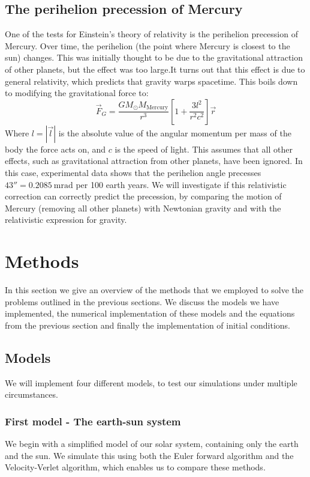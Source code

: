 \documentclass[a4paper, 10pt]{article}
\begin{document}
\subsection{The perihelion precession of Mercury}\label{GR_section}
One of the tests for Einstein's theory of relativity is the perihelion precession of Mercury.  Over time, the perihelion (the point where Mercury is closest to the sun) changes. This was initially thought to be due to the gravitational attraction of other planets, but the effect was too large.It turns out that this effect is due to general relativity, which predicts that gravity warps spacetime. This boils down to modifying the gravitational force to:
\begin{equation}\label{eq:GR_equation}
\vec{F}_G=\frac{GM_{\odot}M_{\mathrm{Mercury}}}{r^3}\left[1+\frac{3l^2}{r^2c^2}\right]\vec{r}
\end{equation}
Where $l=|\vec{l}|$ is the absolute value of the angular momentum per mass of the body the force acts on, and $c$ is the speed of light. This assumes that all other effects, such as gravitational attraction from other planets, have been ignored. In this case, experimental data shows that the perihelion angle precesses $43''=0.2085\  \mathrm{mrad}$ per 100 earth years. We will investigate if this relativistic correction can correctly predict the precession, by comparing the motion of Mercury (removing all other planets) with Newtonian gravity and with the relativistic expression for gravity.
\section{Methods}
In this section we give an overview of the methods that we employed to solve the problems outlined in the previous sections. We discuss the models we have implemented, the numerical implementation of these models and the equations from the previous section and finally the implementation of initial conditions.
\subsection{Models}\label{models}
We will implement four different models, to test our simulations under multiple circumstances. 
\subsubsection{First model - The earth-sun system}\label{First_model}
We begin with a simplified model of our solar system, containing only the earth and the sun. We simulate this using both the Euler forward algorithm and the Velocity-Verlet algorithm, which enables us to compare these methods. 
\end{document}
